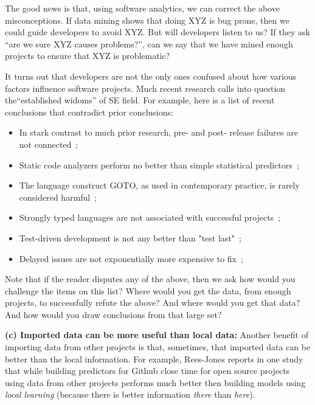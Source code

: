 \documentclass[10pt,journal,compsoc]{IEEEtran}
\newcommand{\bi}{\begin{itemize}}
\newcommand{\ei}{\end{itemize}}
\begin{document}
The good news is that, using software analytics, we can correct the above misconceptions. If data mining shows that doing  XYZ is bug prone, then we could  guide developers to avoid XYZ. But will developers listen to us? If they ask ``are we sure  XYZ causes problems?'', can we say that we have mined enough projects to ensure that XYZ is problematic? 

It turns out that developers are not the only ones confused about how various factors influence software projects. Much recent research calls into question  the``established widoms'' of SE field. For example, here is a list of recent conclusions that contradict prior conclusions:

\bi

    \item In stark contrast to  much prior research, pre- and post- release failures are not connected~\cite{fenton2000quantitative};
    
    \item Static code analyzers perform no better than simple statistical predictors~\cite{Fa13}; 
    
    \item The language construct GOTO, as used in contemporary practice, is rarely considered harmful~\cite{nagappan2015empirical};
    
    \item Strongly typed languages are not associated with successful projects~\cite{ray2014large};  
    
    \item Test-driven development is not any better than "test last"~\cite{fucci2017dissection};
    
    \item Delayed issues are not exponentially more expensive to fix~\cite{menzies2017delayed};

\ei

Note that if the reader disputes any of the above, then we ask how would you challenge the items on this list? Where would you get the data, from enough projects, to   successfully refute the above? And where would you get that data? And how would you draw conclusions from that large set?

\textbf{(c) Imported data can be more useful than local data:} Another benefit of  importing data from other projects is that, sometimes, that imported data can be better than the local information. For example, Rees-Jones reports in one study that while building predictors
for Github close time  for open source projects~\cite{rees2017better} using data from other projects performs much better then building models using {\em local learning} (because there is better  information {\em there} than {\em here}).
\end{document}
